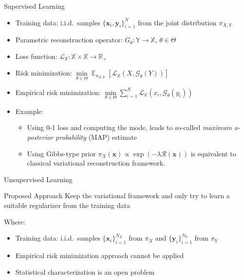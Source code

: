 \documentclass{beamer}
\DeclareMathOperator{\EX}{\mathbb{E}}
\begin{document}
\begin{frame}{Supervised Learning}
\begin{itemize}
\item Training data: i.i.d.\ samples $\lbrace \pmb{x}_i, \pmb{y}_i \rbrace_{i=1}^{N}$ from the joint distribution $\pi_{X, Y}$
\item Parametric reconstruction operator: $G_{\theta}: \mathbb{Y} \rightarrow \mathbb{X}$, $\theta \in \Theta$
\item Loss function: $\mathcal{L}_{\mathbb{X}}: \mathbb{X} \times \mathbb{X} \rightarrow \mathbb{R}_{+}$
\item Risk minimization: $\min\limits_{\theta \in \Theta} \EX_{\pi_{X, Y}} \left[ \mathcal{L}_{\mathbb{X}}(X, \mathcal{G}_{\theta}(Y)) \right]$
\item Empirical risk minimization: $\min\limits_{\theta \in \Theta} \sum\limits_{i=1}^{N} \mathcal{L}_{\mathbb{X}}(x_i, \mathcal{G}_{\theta}(y_i))$
\item Example: 
\begin{itemize}
\item Using 0-1 loss and computing the mode, leads to so-called {\it maximum a-posterior probability} (MAP) estimate
\item Using Gibbs-type prior $\pi_{X}(\pmb{x}) \propto \exp{ \left(- \lambda \mathcal{R}(\pmb{x})\right)}$ is equivalent to classical variational reconstruction framework.
\end{itemize}
\end{itemize}
\end{frame}

\begin{frame}{Unsupervised Learning}
\begin{block}{Proposed Approach}
Keep the variational framework and only try to learn a suitable regularizer from the training data
\end{block}
Where:
\begin{itemize}
\item Training data: i.i.d.\ samples $\lbrace \pmb{x}_i \rbrace_{i = 1}^{N_{X}}$ from $\pi_{X}$ and $\lbrace \pmb{y}_i \rbrace_{i = 1}^{N_{Y}}$ from $\pi_{Y}$
\item Empirical risk minimization approach cannot be applied
\item Statistical characterization is an open problem
\end{itemize}
\end{frame}
\end{document}
